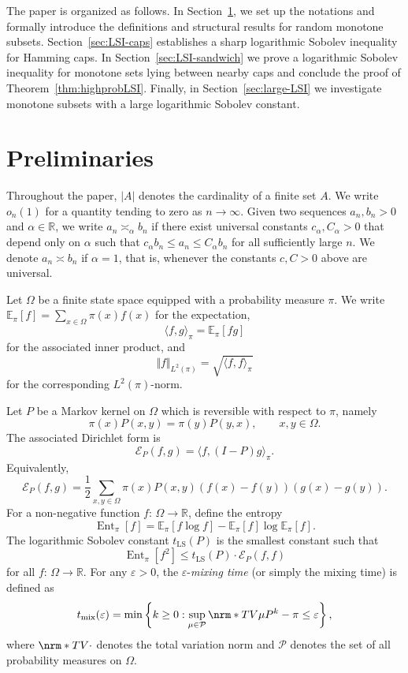\documentclass[12pt,final]{amsart}
\newcommand{\1}{\mathbf{1}}
\newcommand{\tmix}{t_{\operatorname{mix}}(\varepsilon)}
\newcommand{\Exp}[2]{\mathbb{E}_{#1}\left[#2\right]}
\newcommand{\Ent}{\operatorname{Ent}}
\newcommand{\Ecal}{\mathcal{E}}
\newcommand{\R}{\mathbb{R}}
\newcommand{\TV}[1]{\nrm*{TV}{#1}}
\begin{document}
The paper is organized as follows. In Section~\ref{sec:preliminaries}, we set up the notations and formally introduce the definitions and structural results for random monotone subsets. Section~\ref{sec:LSI-caps} establishes a sharp logarithmic Sobolev inequality for Hamming caps. In Section~\ref{sec:LSI-sandwich} we prove a logarithmic Sobolev inequality for monotone sets lying between nearby caps and conclude the proof of Theorem~\ref{thm:highprobLSI}. Finally, in Section~\ref{sec:large-LSI} we investigate monotone subsets with a large logarithmic Sobolev constant. 



\section{Preliminaries}\label{sec:preliminaries}

Throughout the paper, $|A|$ denotes the cardinality of a finite set $A$. We write $o_n(1)$ for a quantity tending to zero as $n\to\infty$. Given two sequences $a_n,b_n>0$ and $\alpha \in \R$, we write $a_n\asymp_\alpha b_n$ if there exist universal constants $c_{\alpha}, C_{\alpha}>0$ that depend only on $\alpha$ such that $c_{\alpha}b_n\leq a_n\leq C_{\alpha}b_n$ for all sufficiently large $n$. We denote $a_n \asymp b_n$ if $\alpha=1$, that is, whenever the constants $c, C>0$ above are universal.

Let $\Omega$ be a finite state space equipped with a probability measure $\pi$. We write $\Exp{\pi}{f}=\sum_{x\in\Omega} \pi(x) f(x)$ for the expectation,  
$$
\langle f,g\rangle_\pi= \Exp{\pi}{fg}
$$
for the associated inner product, and
$$
\Vert f\Vert_{L^2(\pi)}=\sqrt{\langle f,f\rangle_{\pi}}
$$
for the corresponding $L^2(\pi)$-norm. 

Let $P$ be a Markov kernel on $\Omega$ which is reversible with respect to $\pi$, namely 
$$
\pi(x)P(x,y)=\pi(y)P(y,x),\qquad x,y\in \Omega.
$$
The associated Dirichlet form is 
$$
\Ecal_P(f,g)=\langle f, (I-P)g\rangle_\pi.
$$
Equivalently, 
$$
\Ecal_P(f,g)=\frac12\sum_{x,y\in \Omega} \pi(x)P(x,y) (f(x)-f(y))(g(x)-g(y)).
$$
For a non-negative function $f:\, \Omega \to \R$, define the entropy 
$$
\Ent_{\pi}[f]= \Exp{\pi}{f\log f} - \Exp{\pi}f\log\Exp{\pi}{f}.
$$
The logarithmic Sobolev constant $t_{\operatorname{LS}}(P)$ is the smallest constant such that 
$$
\Ent_{\pi}[f^2] \leq t_{\operatorname{LS}}(P) \cdot \Ecal_P(f, f)
$$
for all $f:\, \Omega\to \R$. 
For any $\varepsilon>0$, the $\varepsilon$-\emph{mixing time} (or simply the mixing time) is defined as 
$$
   \tmix =\min \left\{k\geq 0: \sup_{\mu \in \mathcal{P}}\TV{\mu P^k-\pi}\leq \varepsilon\right\}, 
$$
where $\TV{\cdot}$ denotes the total variation norm and $\mathcal{P}$ denotes the set of all probability measures on $\Omega$. 
\end{document}
